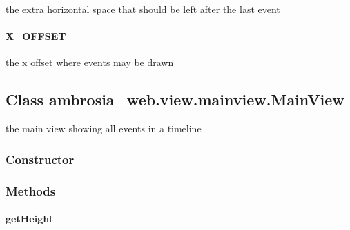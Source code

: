 \documentclass[letterpaper,10pt,english]{sphinxmanual}
\begin{document}
\begin{fulllineitems}
\label{ambrosia_web.view.mainview:EXTRA_WIDTH}
\end{fulllineitems}


the extra horizontal space that should be left after the last event


\paragraph{X\_OFFSET}
\label{ambrosia_web.view.mainview:x-offset}

\begin{fulllineitems}
\label{ambrosia_web.view.mainview:X_OFFSET}
\end{fulllineitems}


the x offset where events may be drawn


\subsection{Class ambrosia\_web.view.mainview.MainView}
\label{ambrosia_web.view.mainview.MainView::doc}\label{ambrosia_web.view.mainview.MainView:class-ambrosia-web-view-mainview-mainview}
the main view showing all events in a timeline


\subsubsection{Constructor}
\label{ambrosia_web.view.mainview.MainView:constructor}

\begin{fulllineitems}
\label{ambrosia_web.view.mainview.MainView:ambrosia_web.view.mainview.MainView}
\end{fulllineitems}



\subsubsection{Methods}
\label{ambrosia_web.view.mainview.MainView:methods}

\paragraph{getHeight}
\label{ambrosia_web.view.mainview.MainView:getheight}
\end{document}
